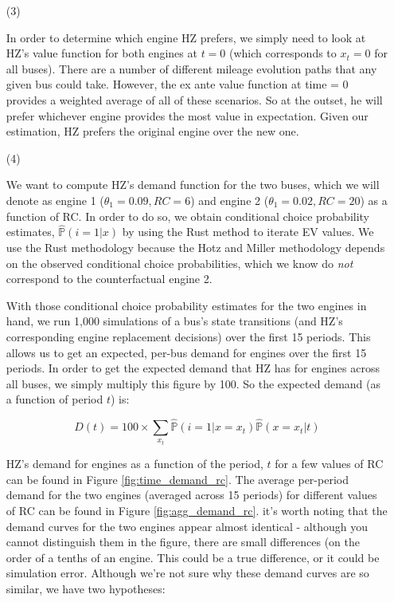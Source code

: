 \documentclass[paper=a4, fontsize=11pt]{scrartcl} %
\numberwithin{equation}{section} %
\numberwithin{figure}{section} %
\numberwithin{table}{section} %
\begin{document}
\begin{itemize}
\begin{itemize}
\item[(3)]

In order to determine which engine HZ prefers, we simply need to look at HZ's value function for both engines at $t=0$ (which corresponds to $x_t = 0$ for all buses). There are a number of different mileage evolution paths that any given bus could take. However, the ex ante value function at time = 0 provides a weighted average of all of these scenarios. So at the outset, he will prefer whichever engine provides the most value in expectation. Given our estimation, HZ prefers the original engine over the new one.

\item[(4)]

We want to compute HZ's demand function for the two buses, which we will denote as engine 1 ($\theta_1 = 0.09, RC = 6$) and engine 2 ($\theta_1 = 0.02, RC = 20$) as a function of RC. In order to do so, we obtain conditional choice probability estimates, $\hat{\mathbb{P}}(i = 1 | x)$ by using the Rust method to iterate EV values. We use the Rust methodology because the Hotz and Miller methodology depends on the observed conditional choice probabilities, which we know do \textit{not} correspond to the counterfactual engine 2.

With those conditional choice probability estimates for the two engines in hand, we run 1,000 simulations of a bus's state transitions (and HZ's corresponding engine replacement decisions) over the first 15 periods. This allows us to get an expected, per-bus demand for engines over the first 15 periods. In order to get the expected demand that HZ has for engines across all buses, we simply multiply this figure by 100. So the expected demand (as a function of period $t$) is:

\begin{equation}
D(t) = 100 \times \sum_{x_t} \hat{\mathbb{P}}(i = 1 | x = x_t) \hat{\mathbb{P}}(x = x_t | t)
\end{equation}

HZ's demand for engines as a function of the period, $t$ for a few values of RC can be found in Figure \ref{fig:time_demand_rc}. The average per-period demand for the two engines (averaged across 15 periods) for different values of RC can be found in Figure \ref{fig:agg_demand_rc}. it's worth noting that the demand curves for the two engines appear almost identical - although you cannot distinguish them in the figure, there are small differences (on the order of a tenths of an engine. This could be a true difference, or it could be simulation error. Although we're not sure why these demand curves are so similar, we have two hypotheses:


\end{itemize}
\end{itemize}
\end{document}
